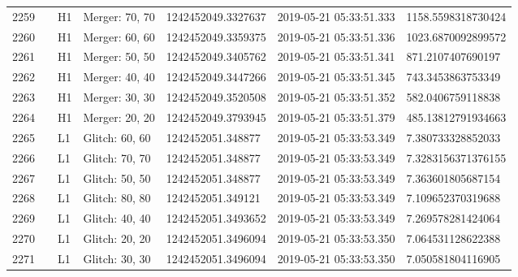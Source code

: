 \begin{longtable}{lllllll}
2259 &                                                    &       H1 &    Merger: 70, 70 &  1242452049.3327637 &  2019-05-21 05:33:51.333 &  1158.5598318730424 \\
2260 &                                                    &       H1 &    Merger: 60, 60 &  1242452049.3359375 &  2019-05-21 05:33:51.336 &  1023.6870092899572 \\
2261 &                                                    &       H1 &    Merger: 50, 50 &  1242452049.3405762 &  2019-05-21 05:33:51.341 &   871.2107407690197 \\
2262 &                                                    &       H1 &    Merger: 40, 40 &  1242452049.3447266 &  2019-05-21 05:33:51.345 &   743.3453863753349 \\
2263 &                                                    &       H1 &    Merger: 30, 30 &  1242452049.3520508 &  2019-05-21 05:33:51.352 &   582.0406759118838 \\
2264 &                                                    &       H1 &    Merger: 20, 20 &  1242452049.3793945 &  2019-05-21 05:33:51.379 &  485.13812791934663 \\
2265 &                                                    &       L1 &    Glitch: 60, 60 &   1242452051.348877 &  2019-05-21 05:33:53.349 &   7.380733328852033 \\
2266 &                                                    &       L1 &    Glitch: 70, 70 &   1242452051.348877 &  2019-05-21 05:33:53.349 &  7.3283156371376155 \\
2267 &                                                    &       L1 &    Glitch: 50, 50 &   1242452051.348877 &  2019-05-21 05:33:53.349 &   7.363601805687154 \\
2268 &                                                    &       L1 &    Glitch: 80, 80 &   1242452051.349121 &  2019-05-21 05:33:53.349 &   7.109652370319688 \\
2269 &                                                    &       L1 &    Glitch: 40, 40 &  1242452051.3493652 &  2019-05-21 05:33:53.349 &   7.269578281424064 \\
2270 &                                                    &       L1 &    Glitch: 20, 20 &  1242452051.3496094 &  2019-05-21 05:33:53.350 &   7.064531128622388 \\
2271 &                                                    &       L1 &    Glitch: 30, 30 &  1242452051.3496094 &  2019-05-21 05:33:53.350 &   7.050581804116905 \\

\end{longtable}
